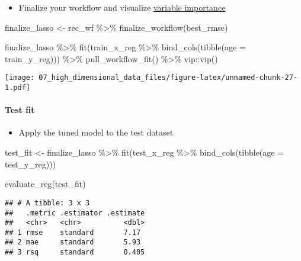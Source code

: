 \documentclass[
]{book}
\newenvironment{Shaded}{\begin{snugshade}}{\end{snugshade}}
\newcommand{\AttributeTok}[1]{\textcolor[rgb]{0.77,0.63,0.00}{#1}}
\newcommand{\FunctionTok}[1]{\textcolor[rgb]{0.00,0.00,0.00}{#1}}
\newcommand{\NormalTok}[1]{#1}
\newcommand{\OtherTok}[1]{\textcolor[rgb]{0.56,0.35,0.01}{#1}}
\newcommand{\SpecialCharTok}[1]{\textcolor[rgb]{0.00,0.00,0.00}{#1}}
\providecommand{\tightlist}{%
  \setlength{\itemsep}{0pt}\setlength{\parskip}{0pt}}
\begin{document}
\begin{itemize}
\tightlist
\item
  Finalize your workflow and visualize \href{https://koalaverse.github.io/vip/articles/vip.html}{variable importance}
\end{itemize}

\begin{Shaded}
\begin{Highlighting}[]
\NormalTok{finalize\_lasso }\OtherTok{\textless{}{-}}\NormalTok{ rec\_wf }\SpecialCharTok{\%\textgreater{}\%}
  \FunctionTok{finalize\_workflow}\NormalTok{(best\_rmse)}

\NormalTok{finalize\_lasso }\SpecialCharTok{\%\textgreater{}\%}
  \FunctionTok{fit}\NormalTok{(train\_x\_reg }\SpecialCharTok{\%\textgreater{}\%} \FunctionTok{bind\_cols}\NormalTok{(}\FunctionTok{tibble}\NormalTok{(}\AttributeTok{age =}\NormalTok{ train\_y\_reg))) }\SpecialCharTok{\%\textgreater{}\%}
  \FunctionTok{pull\_workflow\_fit}\NormalTok{() }\SpecialCharTok{\%\textgreater{}\%}
\NormalTok{  vip}\SpecialCharTok{::}\FunctionTok{vip}\NormalTok{()}
\end{Highlighting}
\end{Shaded}

\texttt{[image: 07\_high\_dimensional\_data\_files/figure-latex/unnamed-chunk-27-1.pdf]}

\hypertarget{test-fit}{%
\paragraph{Test fit}\label{test-fit}}

\begin{itemize}
\tightlist
\item
  Apply the tuned model to the test dataset
\end{itemize}

\begin{Shaded}
\begin{Highlighting}[]
\NormalTok{test\_fit }\OtherTok{\textless{}{-}}\NormalTok{ finalize\_lasso }\SpecialCharTok{\%\textgreater{}\%} 
  \FunctionTok{fit}\NormalTok{(test\_x\_reg }\SpecialCharTok{\%\textgreater{}\%} \FunctionTok{bind\_cols}\NormalTok{(}\FunctionTok{tibble}\NormalTok{(}\AttributeTok{age =}\NormalTok{ test\_y\_reg)))}

\FunctionTok{evaluate\_reg}\NormalTok{(test\_fit)}
\end{Highlighting}
\end{Shaded}

\begin{verbatim}
## # A tibble: 3 x 3
##   .metric .estimator .estimate
##   <chr>   <chr>          <dbl>
## 1 rmse    standard       7.17 
## 2 mae     standard       5.93 
## 3 rsq     standard       0.405
\end{verbatim}
\end{document}
